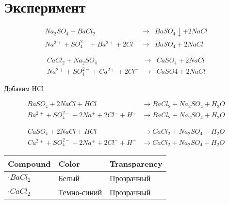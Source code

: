 \section{Эксперимент}

\begin{eqnarray} 
    Na_2SO_4 + BaCl_2 &\rightarrow& BaSO_4\downarrow + 2NaCl \\ 
    Na^{2+} +SO_{4}^{2-} + Ba^{2+} + 2Cl^{-} &\rightarrow& BaSO_{4} + 2NaCl
\end{eqnarray} 


\begin{eqnarray} 
    CaCl_2 + Na_2SO_4 &\rightarrow& CaSO_4 + 2NaCl \\ 
    Na^{2+} + SO_{4}^{2-} + Ca^{2+} + 2Cl^{-} &\rightarrow& CaSO{4} + 2NaCl
\end{eqnarray} 

Добавим HCl

\begin{align}
    BaSO_4 + 2NaCl + HCl &\rightarrow BaCl_2 + Na_2SO_4 + H_2O \\
    Ba^{2 + }+ SO_4^{2 - } + 2Na^ + + 2Cl^ - + H^ + 
    &\rightarrow  BaCl_2 + Na_2SO_4 + H_2O
\end{align}


\begin{align}
    CaSO_4 + 2NaCl + HCl &\rightarrow CaCl_2 + Na_2SO_4 + H_2O \\
    Ca^{2 + }+ SO_4^{2 -} + 2Na^ + + 2Cl^ - + H^ + 
    &\rightarrow CaCl_2 + Na_2SO_4 + H_2O
\end{align}

\begin{center}
    \begin{tabular}{l||l||l}
        Compound & Color & Transparency \\ \hline \hline
        $\cdot BaCl_2$ & Белый & Прозрачный \\
        $\cdot CaCl_2$ & Темно-синий & Прозрачный
    \end{tabular}
\end{center}
